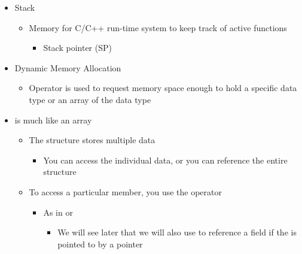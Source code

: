 \begin{itemize}
  \item Stack

    \begin{itemize}

      \item Memory for C/C++ run-time system to keep track of active functions

        \begin{itemize}

          \item Stack pointer (SP)

        \end{itemize}

    \end{itemize}

  \item Dynamic Memory Allocation

    \begin{itemize}

      \item Operator  is used to request memory space enough to hold a specific data type or an array of the data type

    \end{itemize}

  \item {} is much like an array

    \begin{itemize}

      \item The structure stores multiple data

        \begin{itemize}

          \item You can access the individual data, or you can reference the entire structure

        \end{itemize}

      \item To access a particular member, you use the  operator

        \begin{itemize}

          \item As in  or 

            \begin{itemize}

              \item We will see later that we will also use \code{->} to reference a field if the  is pointed to by a pointer


\end{itemize}
\end{itemize}
\end{itemize}
\end{itemize}
